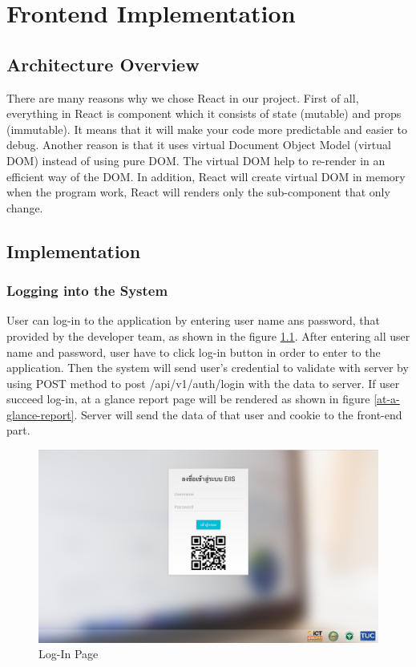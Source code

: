 \chapter{Frontend Implementation}

\section{Architecture Overview}
    There are many reasons why we chose React in our project. First of all, everything in React is component which it consists of state (mutable) and props (immutable). It means that it will make your code more predictable and easier to debug. Another reason is that it uses virtual Document Object Model (virtual DOM) instead of using pure DOM. The virtual DOM help to re-render in an efficient way of the DOM. In addition, React will create virtual DOM in memory when the program work, React will renders only the sub-component that only change. 
    


\section{Implementation}
    
    \subsection{Logging into the System}
    
    User can log-in to the application by entering user name ans password, that provided by the developer team, as shown in the figure \ref{log-in}. After entering all user name and password, user have to click log-in button in order to enter to the application. Then the system will send user's credential to validate with server by using POST method to post /api/v1/auth/login with the data to server. If user succeed log-in, at a glance report page will be rendered as shown in figure \ref{at-a-glance-report}. Server will send the data of that user and cookie to the front-end part.
    
    
    \FloatBarrier
    	\begin{figure}[h!]
            \centering
        		\includegraphics[width=12cm]{images/chapter-05/log-in.png}
        		\caption{Log-In Page}
        		\label{log-in}
        \end{figure}
	\FloatBarrier
	
